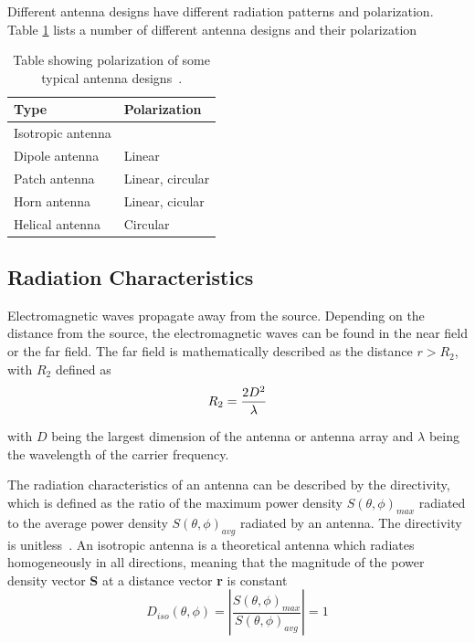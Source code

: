 Different antenna designs have different radiation patterns and polarization. Table \ref{tab:antenna_types} lists a number of different antenna designs and their polarization
\begin{table}[H]
    \centering
    \begin{tabular}{l|l} 
        \textbf{Type} & \textbf{Polarization} \\
        \hline
        \hline
        Isotropic antenna & \\
        Dipole antenna & Linear \\
        Patch antenna & Linear, circular \\
        Horn antenna & Linear, cicular \\
        Helical antenna & Circular \\
    \end{tabular}
    \caption{Table showing polarization of some typical antenna designs~\cite[p. 11]{ant_beam_form}.}
    \label{tab:antenna_types}
\end{table}

\subsection{Radiation Characteristics} \label{ss:rad_char}
Electromagnetic waves propagate away from the source. Depending on the distance from the source, the electromagnetic waves can be found in the near field or the far field. The far field is mathematically described as the distance $r>R_2$, with $R_2$ defined as~\cite[p. 4]{ant_beam_form}
\begin{equation} \label{eq:far_field}
    R_2 = \frac{2 D^2}{\lambda}
    \tagaddtext{[\si{\meter}]}
\end{equation}

with $D$ being the largest dimension of the antenna or antenna array and $\lambda$ being the wavelength of the carrier frequency.

The radiation characteristics of an antenna can be described by the directivity, which is defined as the ratio of the maximum power density $S\left( \theta, \phi \right)_{max}$ radiated to the average power density $S\left( \theta, \phi \right)_{avg}$ radiated by an antenna. The directivity is unitless~\cite[p. 63]{direct_energy}. An isotropic antenna is a theoretical antenna which radiates homogeneously in all directions, meaning that the magnitude of the power density vector \textbf{S} at a distance vector \textbf{r} is constant~\cite[p. 11]{ant_beam_form}
\begin{equation} \label{eq:isotropic_radiation}
    D_{iso}\left( \theta, \phi \right) = \left| \frac{S\left( \theta, \phi \right)_{max}}{S\left( \theta, \phi \right)_{avg}} \right|=1
\end{equation}

